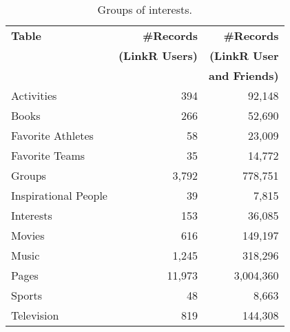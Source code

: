 \documentclass[letterpaper]{article}
\begin{document}
\begin{table}
\centering
\caption{\small Groups of interests.}
\label{tab:interests}
\begin{tabular}{|>{\small}p{2cm}|>{\small}r|>{\small}r|}
\hline
\textbf{Table} & \textbf{\#Records} & \textbf{\#Records} \\
& \textbf{(LinkR Users)} & \textbf{(LinkR User} \\
& & \textbf{and Friends)} \\
\hline
Activities & 394 & 92,148 \\
\hline
Books & 266 & 52,690 \\
\hline
Favorite Athletes & 58 & 23,009 \\
\hline
Favorite Teams & 35 & 14,772 \\
\hline
Groups & 3,792 & 778,751 \\
\hline
Inspirational People & 39 & 7,815 \\
\hline
Interests & 153 & 36,085 \\
\hline
Movies & 616 & 149,197 \\
\hline
Music & 1,245 & 318,296 \\
\hline
Pages & 11,973 & 3,004,360 \\
\hline
Sports & 48 & 8,663 \\
\hline
Television & 819 & 144,308 \\
\hline
\end{tabular}
\end{table}
\end{document}
